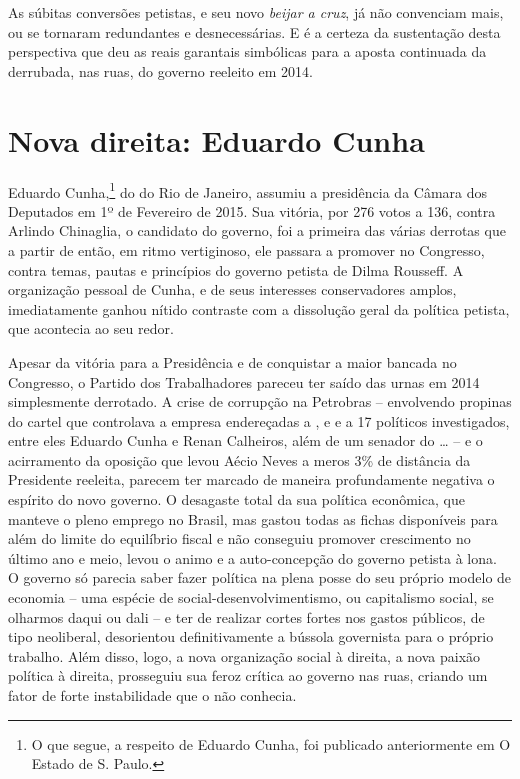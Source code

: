 As súbitas conversões petistas, e seu novo \emph{beijar a cruz}, já não
convenciam mais, ou se tornaram redundantes e desnecessárias. E é a
certeza da sustentação desta perspectiva que deu as reais garantais
simbólicas para a aposta continuada da derrubada, nas ruas, do governo
reeleito em 2014.

  \section[Nova direita: Eduardo Cunha]{Nova direita: Eduardo
    Cunha}\label{nova-direita-eduardo-cunha}

Eduardo Cunha,\footnote{O que segue, a respeito de Eduardo Cunha, foi publicado
  anteriormente em O Estado de S. Paulo.} do  do Rio de Janeiro, assumiu a presidência da
Câmara dos Deputados em 1º de Fevereiro de 2015. Sua vitória, por 276
votos a 136, contra Arlindo Chinaglia, o candidato do governo, foi a
primeira das várias derrotas que a partir de então, em ritmo
vertiginoso, ele passara a promover no Congresso, contra temas, pautas e
princípios do governo petista de Dilma Rousseff. A organização pessoal
de Cunha, e de seus interesses conservadores amplos, imediatamente
ganhou nítido contraste com a dissolução geral da política petista, que
acontecia ao seu redor.

Apesar da vitória para a Presidência e de conquistar a maior bancada no
Congresso, o Partido dos Trabalhadores pareceu ter saído das urnas em
2014 simplesmente derrotado. A crise de corrupção na Petrobras --
envolvendo propinas do cartel que controlava a empresa endereçadas a ,
 e  e a 17 políticos investigados, entre eles Eduardo Cunha e
Renan Calheiros, além de um senador do … -- e o acirramento da
oposição que levou Aécio Neves a meros 3\% de distância da Presidente
reeleita, parecem ter marcado de maneira profundamente negativa o
espírito do novo governo. O desagaste total da sua política econômica,
que manteve o pleno emprego no Brasil, mas gastou todas as fichas
disponíveis para além do limite do equilíbrio fiscal e não conseguiu
promover crescimento no último ano e meio, levou o animo e a
auto-concepção do governo petista à lona. O governo só parecia saber
fazer política na plena posse do seu próprio modelo de economia -- uma
espécie de social-desenvolvimentismo, ou capitalismo social, se olharmos
daqui ou dali -- e ter de realizar cortes fortes nos gastos públicos, de
tipo neoliberal, desorientou definitivamente a bússola governista para o
próprio trabalho. Além disso, logo, a nova organização social à direita,
a nova paixão política à direita, prosseguiu sua feroz crítica ao
governo nas ruas, criando um fator de forte instabilidade que o  não
conhecia.

